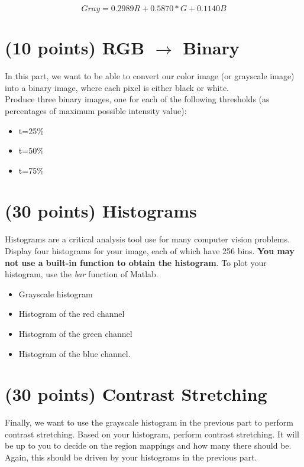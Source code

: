 \documentclass[12pt]{article}
\begin{document}
\begin{equation}
Gray=0.2989R+0.5870*G+0.1140B
\end{equation}

\section{(10 points) RGB $\rightarrow$ Binary}
In this part, we want to be able to convert our color image (or grayscale image) into a binary image, where each pixel is either black or white.\\

\noindent
Produce three binary images, one for each of the following thresholds (as percentages of maximum possible intensity value):
\begin{itemize}
\item t=25\%
\item t=50\%
\item t=75\%
\end{itemize}

\section{(30 points) Histograms}
Histograms are a critical analysis tool use for many computer vision problems.  Display four histograms for your image, each of which have 256 bins.  \textbf{You may not use a built-in function to obtain the histogram}.  To plot your histogram, use the \emph{bar} function of Matlab.

\begin{itemize}
\item Grayscale histogram
\item Histogram of the red channel
\item Histogram of the green channel
\item Histogram of the blue channel.
\end{itemize}


\section{(30 points) Contrast Stretching}
Finally, we want to use the grayscale histogram in the previous part to perform contrast stretching.   Based on your histogram, perform contrast stretching.  It will be up to you to decide on the region mappings and how many there should be.  Again, this should be driven by your histograms in the previous part.\\
\end{document}
